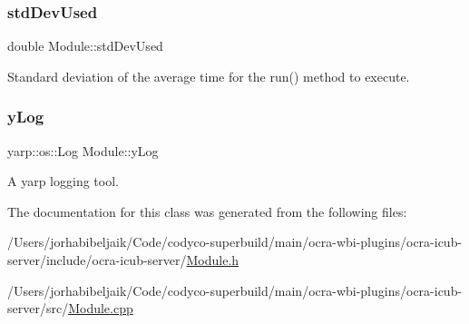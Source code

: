 \subsubsection{\texorpdfstring{std\+Dev\+Used}{stdDevUsed}}
{\footnotesize\ttfamily double Module\+::std\+Dev\+Used\hspace{0.3cm}{\ttfamily [private]}}

Standard deviation of the average time for the {\ttfamily run()} method to execute. \hypertarget{classModule_ae029b50069bf4ff53a6f69a5bae824f6}{}\label{classModule_ae029b50069bf4ff53a6f69a5bae824f6} 
\subsubsection{\texorpdfstring{y\+Log}{yLog}}
{\footnotesize\ttfamily yarp\+::os\+::\+Log Module\+::y\+Log\hspace{0.3cm}{\ttfamily [private]}}

A yarp logging tool. 

The documentation for this class was generated from the following files\+:\begin{DoxyCompactItemize}
\item 
/\+Users/jorhabibeljaik/\+Code/codyco-\/superbuild/main/ocra-\/wbi-\/plugins/ocra-\/icub-\/server/include/ocra-\/icub-\/server/\hyperlink{Module_8h}{Module.\+h}\item 
/\+Users/jorhabibeljaik/\+Code/codyco-\/superbuild/main/ocra-\/wbi-\/plugins/ocra-\/icub-\/server/src/\hyperlink{Module_8cpp}{Module.\+cpp}\end{DoxyCompactItemize}
